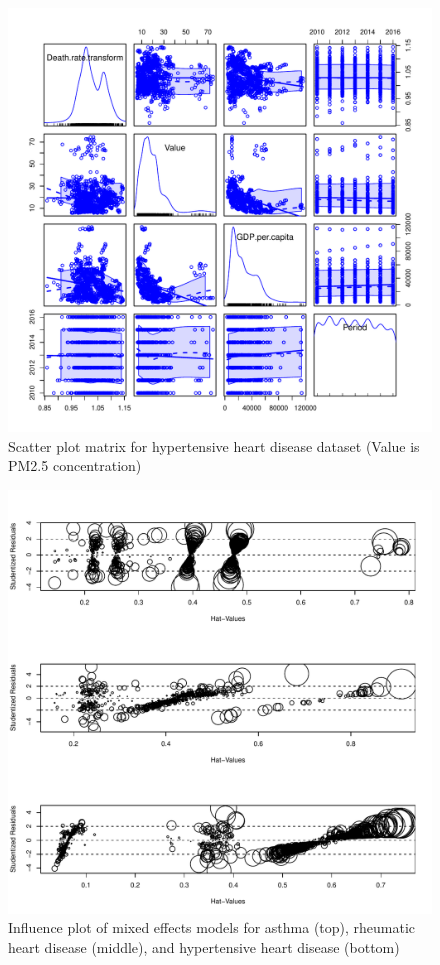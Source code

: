 \documentclass[12pt, letterpaper, twoside]{article}\usepackage[]{graphicx}\usepackage[]{xcolor}
\begin{document}
\begin{figure}[t]
\includegraphics[scale=0.5]{scatterplotmatrix.hyper.pdf}
\centering
\caption{Scatter plot matrix for hypertensive heart disease dataset (Value is PM2.5 concentration)}
\label{fig:Figure 4}
    \vspace{1cm}
\end{figure}

\begin{figure}[t]
\includegraphics[scale=0.5]{influenceplot.pdf}
\centering
\caption{Influence plot of mixed effects models for asthma (top), rheumatic heart
disease (middle), and hypertensive heart disease (bottom)}
\label{fig:Figure 5}
    \vspace{1cm}
\end{figure}
\end{document}

